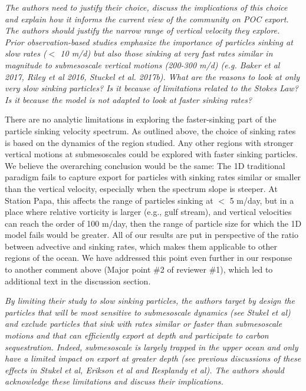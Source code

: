 \documentclass[12pt,letter]{article}
\begin{document}
\textit{The authors need to justify their choice, discuss the implications of this choice and explain how it informs the current view of the community on POC export. The authors should justify the narrow range of vertical velocity they explore. Prior observation-based studies emphasize the importance of particles sinking at slow rates ($<$ 10 m/d) but also those sinking at very fast rates similar in magnitude to submesoscale vertical motions (200-300 m/d) (e.g. Baker et al 2017, Riley et al 2016, Stuckel et al. 2017b). What are the reasons to look at only very slow sinking particles? Is it because of limitations related to the Stokes Law? Is it because the model is not adapted to look at faster sinking rates?}

{\color{blue}
	There are no analytic limitations in exploring the faster-sinking part of the particle sinking velocity spectrum. As outlined above, the choice of sinking rates is based on the dynamics of the region studied. Any other regions with stronger vertical motions at submesoscales could be explored with faster sinking particles. We believe the overarching conclusion would be the same: The 1D traditional paradigm fails to capture export for particles with sinking rates similar or smaller than the vertical velocity, especially when the spectrum slope is steeper. At Station Papa, this affects the range of particles sinking at $<$ 5 m/day, but in a place where relative vorticity is larger (e.g., gulf stream), and vertical velocities can reach the order of 100 m/day, then the range of particle size for which the 1D model fails would be greater. All of our results are put in perspective of the ratio between advective and sinking rates, which makes them applicable to other regions of the ocean. We have addressed this point even further in our response to another comment above (Major point \#2 of reviewer \#1), which led to additional text in the discussion section.\\}

\textit{By limiting their study to slow sinking particles, the authors target by design the particles that will be most sensitive to submesoscale dynamics (see Stukel et al) and exclude particles that sink with rates similar or faster than submesoscale motions and that can efficiently export at depth and participate to carbon sequestration. Indeed, submesoscale is largely trapped in the upper ocean and only have a limited impact on export at greater depth (see previous discussions of these effects in Stukel et al, Erikson et al and Resplandy et al). The authors should acknowledge these limitations and discuss their implications.\\}
\end{document}
